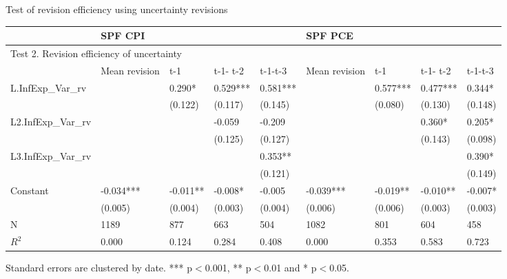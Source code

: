\documentclass{beamer}
\begin{document}
\begin{frame}{Test of revision efficiency using uncertainty revisions}

\begin{adjustbox}{width=0.9\textwidth}
	\begin{threeparttable}
		\label{VarRevEfficiency}
		\begin{tabular}{lllllllll}
			\hline 
			& \multicolumn{4}{l}{SPF CPI}                     & \multicolumn{4}{l}{SPF PCE}                       \\
			\hline 
			\multicolumn{9}{l}{Test 2. Revision efficiency of uncertainty}                                                            \\
			\hline 
			& Mean revision & t-1       & t-1- t-2 & t-1-t-3  & Mean revision & t-1       & t-1- t-2  & t-1-t-3   \\
			\hline 
			L.InfExp\_Var\_rv   &               & 0.290*    & 0.529*** & 0.581*** &               & 0.577***  & 0.477***  & 0.344*    \\
			&               & (0.122)   & (0.117)  & (0.145)  &               & (0.080)   & (0.130)   & (0.148)   \\
			L2.InfExp\_Var\_rv  &               &           & -0.059   & -0.209   &               &           & 0.360*    & 0.205*    \\
			&               &           & (0.125)  & (0.127)  &               &           & (0.143)   & (0.098)   \\
			L3.InfExp\_Var\_rv  &               &           &          & 0.353**  &               &           &           & 0.390*    \\
			&               &           &          & (0.121)  &               &           &           & (0.149)   \\
			Constant              & -0.034***     & -0.011**  & -0.008*  & -0.005   & -0.039***     & -0.019**  & -0.010**  & -0.007*   \\
			& (0.005)       & (0.004)   & (0.003)  & (0.004)  & (0.006)       & (0.006)   & (0.003)   & (0.003)   \\
			\hline 
			N                   & 1189          & 877       & 663      & 504      & 1082          & 801       & 604       & 458       \\
			$R^2$                 & 0.000         & 0.124     & 0.284    & 0.408    & 0.000         & 0.353     & 0.583     & 0.723    \\
			\hline 
		\end{tabular} 
		\begin{tablenotes}
			\item Standard errors are clustered by date. *** p$<$0.001, ** p$<$0.01 and * p$<$0.05.
		\end{tablenotes}
	\end{threeparttable}
\end{adjustbox}

\end{frame}
\end{document}
